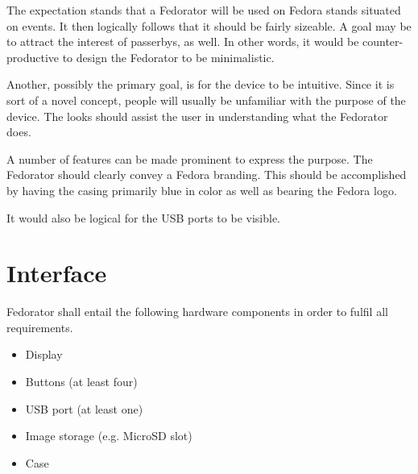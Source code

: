         The expectation stands that a Fedorator will be used on Fedora stands situated on events.  It then logically follows that it should be fairly sizeable.  A goal may be to attract the interest of passerbys, as well.  In other words, it would be counter-productive to design the Fedorator to be minimalistic.
        
        Another, possibly the primary goal, is for the device to be intuitive.  Since it is sort of a novel concept, people will usually be unfamiliar with the purpose of the device.  The looks should assist the user in understanding what the Fedorator does.
        
        A number of features can be made prominent to express the purpose.  The Fedorator should clearly convey a Fedora branding.  This should be accomplished by having the casing primarily blue in color as well as bearing the Fedora logo.
        
        
        It would also be logical for the USB ports to be visible.
        
        
        
    \section{Interface}
        
        
        
        Fedorator shall entail the following hardware components in order to fulfil all requirements.
        \begin{itemize}
            \item Display
            \item Buttons (at least four)
            \item USB port (at least one)
            \item Image storage (e.g. MicroSD slot)
            \item Case
        \end{itemize}
        
        \blind[1]
